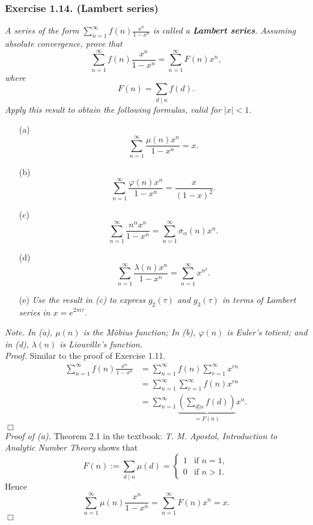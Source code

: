 \documentclass{article}
\begin{document}
\subsubsection*{Exercise 1.14. (Lambert series)}
\emph{A series of the form $\sum_{n=1}^{\infty} f(n)\frac{x^n}{1-x^n}$
is called a \textbf{Lambert series}.
Assuming absolute convergence, prove that
\[
  \sum_{n=1}^{\infty} f(n)\frac{x^n}{1-x^n}
  = \sum_{n=1}^{\infty} F(n)x^n,
\]
where
\[
  F(n) = \sum_{d \mid n} f(d).
\]
Apply this result to obtain the following formulas, valid for $|x| < 1$.}
\begin{enumerate}
\item[(a)]
  \[
    \sum_{n=1}^{\infty} \frac{\mu(n)x^n}{1-x^n} = x.
  \]

\item[(b)]
  \[
    \sum_{n=1}^{\infty} \frac{\varphi(n)x^n}{1-x^n} = \frac{x}{(1-x)^2}.
  \]

\item[(c)]
  \[
    \sum_{n=1}^{\infty} \frac{n^{\alpha}x^n}{1-x^n}
    = \sum_{n=1}^{\infty} \sigma_{\alpha}(n)x^n.
  \]

\item[(d)]
  \[
    \sum_{n=1}^{\infty} \frac{\lambda(n)x^n}{1-x^n} = \sum_{n=1}^{\infty} x^{n^2}.
  \]

\item[(e)]
  \emph{Use the result in (c) to express $g_2(\tau)$ and $g_3(\tau)$
  in terms of Lambert series in $x = e^{2\pi i \tau}$.} \\
\end{enumerate}
\emph{Note. In (a), $\mu(n)$ is the M\"obius function;
In (b), $\varphi(n)$ is Euler's totient;
and in (d), $\lambda(n)$ is Liouville's function.} \\



\emph{Proof.}
  Similar to the proof of Exercise 1.11.
  \begin{align*}
    \sum_{n=1}^{\infty} f(n)\frac{x^n}{1-x^n}
    &= \sum_{n=1}^{\infty} f(n) \sum_{r=1}^{\infty} x^{rn} \\
    &= \sum_{n=1}^{\infty} \sum_{r=1}^{\infty} f(n) x^{rn} \\
    &= \sum_{n=1}^{\infty} \underbrace{\left( \sum_{d|n} f(d) \right)}_{= F(n)} x^n.
  \end{align*}
$\Box$ \\



\emph{Proof of (a).}
  Theorem 2.1 in the textbook: \emph{T. M. Apostol, Introduction to Analytic Number Theory}
  shows that
  \begin{equation*}
    F(n) := \sum_{d \mid n} \mu(d) =
    \begin{cases}
      1 & \text{if $n = 1$}, \\
      0 & \text{if $n > 1$}.
    \end{cases}
  \end{equation*}
  Hence
  \[
    \sum_{n=1}^{\infty} \mu(n)\frac{x^n}{1-x^n}
    = \sum_{n=1}^{\infty} F(n)x^n
    = x.
  \]
$\Box$ \\
\end{document}
